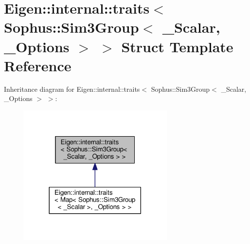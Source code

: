 \hypertarget{struct_eigen_1_1internal_1_1traits_3_01_sophus_1_1_sim3_group_3_01___scalar_00_01___options_01_4_01_4}{}\section{Eigen\+:\+:internal\+:\+:traits$<$ Sophus\+:\+:Sim3\+Group$<$ \+\_\+\+Scalar, \+\_\+\+Options $>$ $>$ Struct Template Reference}
\label{struct_eigen_1_1internal_1_1traits_3_01_sophus_1_1_sim3_group_3_01___scalar_00_01___options_01_4_01_4}


Inheritance diagram for Eigen\+:\+:internal\+:\+:traits$<$ Sophus\+:\+:Sim3\+Group$<$ \+\_\+\+Scalar, \+\_\+\+Options $>$ $>$\+:
\nopagebreak
\begin{figure}[H]
\begin{center}
\leavevmode
\includegraphics[width=221pt]{struct_eigen_1_1internal_1_1traits_3_01_sophus_1_1_sim3_group_3_01___scalar_00_01___options_01_4_01_4__inherit__graph}
\end{center}
\end{figure}
